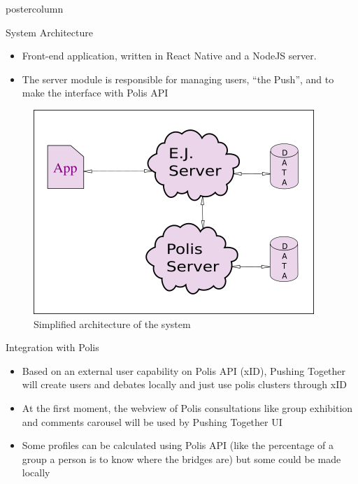 \documentclass[final,hyperref={pdfpagelabels=false}]{beamer}
\newlength{\columnheight}
\begin{document}
\begin{frame}
\begin{columns}
\begin{column}{.49\textwidth}
  \begin{beamercolorbox}[center,wd=\textwidth]{postercolumn}
    \begin{minipage}[T]{.95\textwidth} %
      \parbox[t][\columnheight]{\textwidth}{ %

\begin{block}{System Architecture}
	\begin{itemize}
    \item Front-end application, written in React Native
    and a NodeJS server.

    \item The server module is responsible for managing users, ``the Push'', and
    to make the interface with Polis API
  \end{itemize}

  \begin{figure}
    \begin{center}
      \includegraphics[scale=1.5]{../images/architecture-1.png}
      \caption{Simplified architecture of the system}
      \label{fig:architecture}
    \end{center}
  \end{figure}
\end{block}

\begin{block}{Integration with Polis}
\begin{itemize}
  \item Based on an external user capability on Polis API (xID), Pushing Together
  will create users and debates locally and just use polis clusters through xID
  \item At the first moment, the webview of Polis consultations like group
  exhibition and comments carousel will be used by Pushing Together UI
  \item Some profiles can be calculated using Polis API (like the percentage of a
  group a person is to know where the bridges are) but some could be made locally


\end{itemize}
\end{block}}
\end{minipage}
\end{beamercolorbox}
\end{column}
\end{columns}
\end{frame}
\end{document}
